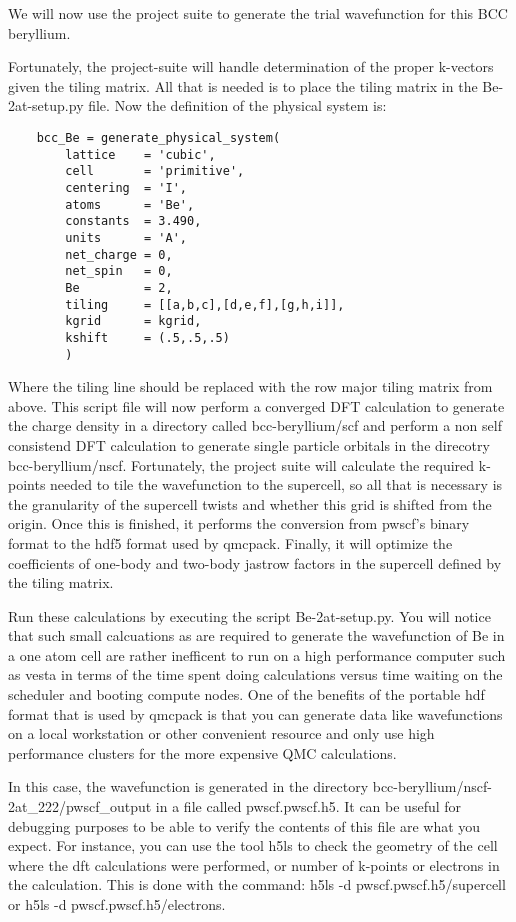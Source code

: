 We will now use the project suite to generate the trial wavefunction for this BCC beryllium.

Fortunately, the project-suite will handle determination of the proper k-vectors given the tiling matrix.  All that is needed is to place the tiling matrix in the Be-2at-setup.py file.   Now the definition of the physical system is:

\begin{lstlisting}
    bcc_Be = generate_physical_system(
        lattice    = 'cubic',
        cell       = 'primitive',
        centering  = 'I',
        atoms      = 'Be',
        constants  = 3.490,
        units      = 'A',
        net_charge = 0,
        net_spin   = 0,
        Be         = 2,
        tiling     = [[a,b,c],[d,e,f],[g,h,i]],
        kgrid      = kgrid,
        kshift     = (.5,.5,.5)
        )
\end{lstlisting}
Where the tiling line should be replaced with the row major tiling matrix from above.  This script file will now perform a converged DFT calculation to generate the charge density in a directory called bcc-beryllium/scf and perform a non self consistend DFT calculation to generate single particle orbitals in the direcotry bcc-beryllium/nscf.  Fortunately, the project suite will calculate the required k-points needed to tile the wavefunction to the supercell, so all that is necessary is the granularity of the supercell twists and whether this grid is shifted from the origin.  Once this is finished, it performs the conversion from pwscf's binary format to the hdf5 format used by qmcpack.  Finally, it will optimize the coefficients of one-body and two-body jastrow factors in the supercell defined by the tiling matrix.

Run these calculations by executing the script Be-2at-setup.py.  You will notice that such small calcuations as are required to generate the wavefunction of Be in a one atom cell are rather inefficent to run on a high performance computer such as vesta in terms of the time spent doing calculations versus time waiting on the scheduler and booting compute nodes.  One of the benefits of the portable hdf format that is used by qmcpack is that you can generate data like wavefunctions on a local workstation or other convenient resource and only use high performance clusters for the more expensive QMC calculations.

In this case, the wavefunction is generated in the directory bcc-beryllium/nscf-2at\_222/pwscf\_output in a file called pwscf.pwscf.h5.  It can be useful for debugging purposes to be able to verify the contents of this file are what you expect.  For instance, you can use the tool h5ls to check the geometry of the cell where the dft calculations were performed, or number of k-points or electrons in the calculation.  This is done with the command: h5ls -d pwscf.pwscf.h5/supercell or h5ls -d pwscf.pwscf.h5/electrons.

